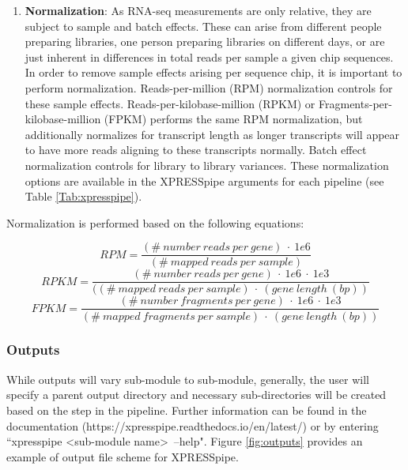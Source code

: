 \documentclass[11pt, a4paper, oneside]{article}
\begin{document}
\begin{enumerate}
  \item \textbf{Normalization}: As RNA-seq measurements are only relative, they are subject to sample and batch effects. These can arise from different people preparing libraries, one person preparing libraries on different days, or are just inherent in differences in total reads per sample a given chip sequences. In order to remove sample effects arising per sequence chip, it is important to perform normalization. Reads-per-million (RPM) normalization controls for these sample effects. Reads-per-kilobase-million (RPKM) or Fragments-per-kilobase-million (FPKM) performs the same RPM normalization, but additionally normalizes for transcript length as longer transcripts will appear to have more reads aligning to these transcripts normally. Batch effect normalization controls for library to library variances. These normalization options are available in the XPRESSpipe arguments for each pipeline (see Table \ref{Tab:xpresspipe}).
\end{enumerate}

Normalization is performed based on the following equations:

\[ RPM = \frac{(\#\ number\ reads\ per\ gene)\ \cdot\ 1e6}{(\#\ mapped\ reads\ per\ sample)} \]
\[ RPKM = \frac{(\#\ number\ reads\ per\ gene)\ \cdot\ 1e6\ \cdot\ 1e3}{((\#\ mapped\ reads\ per\ sample)\ \cdot\ (gene\ length\ (bp))} \]
\[ FPKM = \frac{(\#\ number\ fragments\ per\ gene)\ \cdot\ 1e6\ \cdot\ 1e3}{(\#\ mapped\ fragments\ per\ sample)\ \cdot\ (gene\ length\ (bp))} \]

\subsubsection{Outputs}
While outputs will vary sub-module to sub-module, generally, the user will specify a parent output directory and necessary sub-directories will be created based on the step in the pipeline. Further information can be found in the documentation (https://xpresspipe.readthedocs.io/en/latest/) or by entering ``xpresspipe \textless sub-module name\textgreater \ --help". Figure \ref{fig:outputs} provides an example of output file scheme for XPRESSpipe.
\end{document}
